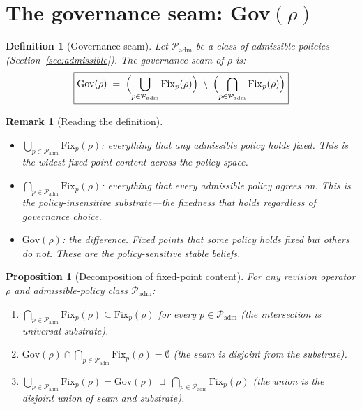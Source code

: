 \documentclass[11pt]{article}
\newtheorem{definition}{Definition}
\newtheorem{proposition}{Proposition}
\newtheorem{remark}{Remark}
\newcommand{\Gov}{\mathrm{Gov}}
\newcommand{\Fix}{\mathrm{Fix}}
\newcommand{\Padm}{\mathcal{P}_{\mathrm{adm}}}
\begin{document}
\section{The governance seam: Gov$(\rho)$}
\label{sec:governance-seam}

\begin{definition}[Governance seam]
\label{def:governance-seam}
Let $\Padm$ be a class of admissible policies (Section~\ref{sec:admissible}). The
\emph{governance seam} of $\rho$ is:
\[
  \boxed{\Gov(\rho) \;=\; \Bigl(\bigcup_{p \in \Padm} \Fix_p(\rho)\Bigr) \;\setminus\;
  \Bigl(\bigcap_{p \in \Padm} \Fix_p(\rho)\Bigr)}
\]
\end{definition}

\begin{remark}[Reading the definition]
\begin{itemize}
  \item $\bigcup_{p \in \Padm} \Fix_p(\rho)$: everything that \emph{any} admissible policy holds
        fixed. This is the widest fixed-point content across the policy space.
  \item $\bigcap_{p \in \Padm} \Fix_p(\rho)$: everything that \emph{every} admissible policy
        agrees on. This is the policy-insensitive substrate---the fixedness that holds
        regardless of governance choice.
  \item $\Gov(\rho)$: the difference. Fixed points that some policy holds fixed but others do
        not. These are the \emph{policy-sensitive stable beliefs}.
\end{itemize}
\end{remark}

\begin{proposition}[Decomposition of fixed-point content]
\label{prop:decomposition}
For any revision operator $\rho$ and admissible-policy class $\Padm$:
\begin{enumerate}
  \item $\bigcap_{p \in \Padm} \Fix_p(\rho) \subseteq \Fix_p(\rho)$ for every $p \in \Padm$
        (the intersection is universal substrate).
  \item $\Gov(\rho) \cap \bigcap_{p \in \Padm} \Fix_p(\rho) = \emptyset$ (the seam is disjoint
        from the substrate).
  \item $\bigcup_{p \in \Padm} \Fix_p(\rho) = \Gov(\rho) \;\sqcup\; \bigcap_{p \in \Padm}
        \Fix_p(\rho)$ (the union is the disjoint union of seam and substrate).
\end{enumerate}
\end{proposition}
\end{document}
